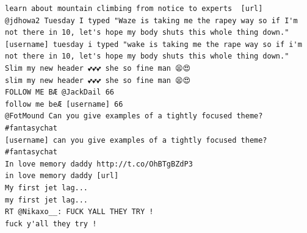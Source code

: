 \documentclass[twocolumn,10pt]{article}
\begin{document}
\begin{lstlisting}
learn about mountain climbing from notice to experts  [url]
@jdhowa2 Tuesday I typed "Waze is taking me the rapey way so if I'm not there in 10, let's hope my body shuts this whole thing down."
[username] tuesday i typed "wake is taking me the rape way so if i'm not there in 10, let's hope my body shuts this whole thing down."
Slim my new header 💕💕💕 she so fine man 😫😍
slim my new header 💕💕💕 she so fine man 😫😍
FOLLOW ME BÆ @JackDail 66
follow me beÆ [username] 66
@FotMound Can you give examples of a tightly focused theme? #fantasychat
[username] can you give examples of a tightly focused theme? #fantasychat
In love memory daddy http://t.co/OhBTgBZdP3
in love memory daddy [url]
My first jet lag...
my first jet lag...
RT @Nikaxo__: FUCK YALL THEY TRY !
fuck y'all they try !
\end{lstlisting}


\end{document}
